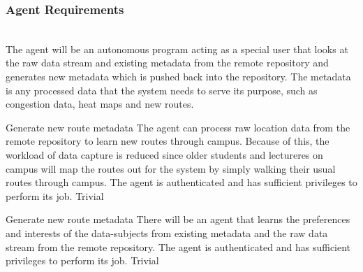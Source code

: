 \subsubsection{Agent Requirements}\mbox{}\\
The agent will be an autonomous program acting as a special user that looks at the raw data stream and existing metadata from the remote repository and generates new metadata which is pushed back into the repository. The metadata is any processed data that the system needs to serve its purpose, such as congestion data, heat maps and new routes.
\\
\bigskip

\FuncReq
{Generate new route metadata}
{The agent can process raw location data from the remote repository to learn new routes through campus. Because of this, the workload of data capture is reduced since older students and lectureres on campus will map the routes out for the system by simply walking their usual routes through campus.}
{The agent is authenticated and has sufficient privileges to perform its job.}
{Trivial}

\FuncReq
{Generate new route metadata}
{There will be an agent that learns the preferences and interests of the data-subjects from existing metadata and the raw data stream from the remote repository.}
{The agent is authenticated and has sufficient privileges to perform its job.}
{Trivial}
 
